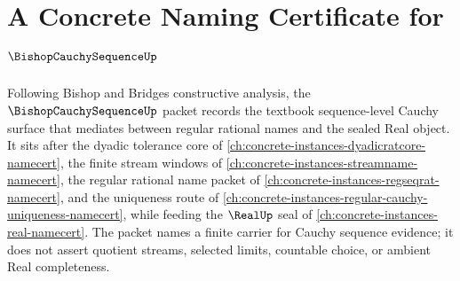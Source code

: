 \chapter{A Concrete Naming Certificate for $\BishopCauchySequenceUp$}
\label{ch:concrete-instances-bishop-cauchy-sequence-namecert}

Following Bishop and Bridges constructive analysis, the $\BishopCauchySequenceUp$ packet records the textbook sequence-level Cauchy surface that mediates between regular rational names and the sealed Real object. It sits after the dyadic tolerance core of \autoref{ch:concrete-instances-dyadicratcore-namecert}, the finite stream windows of \autoref{ch:concrete-instances-streamname-namecert}, the regular rational name packet of \autoref{ch:concrete-instances-regseqrat-namecert}, and the uniqueness route of \autoref{ch:concrete-instances-regular-cauchy-uniqueness-namecert}, while feeding the $\RealUp$ seal of \autoref{ch:concrete-instances-real-namecert}. The packet names a finite carrier for Cauchy sequence evidence; it does not assert quotient streams, selected limits, countable choice, or ambient Real completeness.


